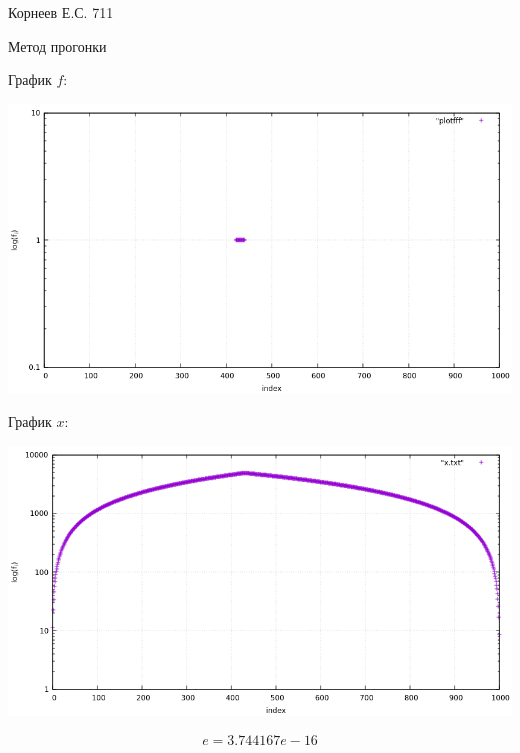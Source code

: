\documentclass[14pt]{article}
\begin{document}
Корнеев Е.С.
711
\begin{center}
	\fontsize{16pt}{18pt}\selectfont
	Метод прогонки
\end{center}

\fontsize{14pt}{16pt}\selectfont

График $f$:

\includegraphics[scale=0.6]{f_plot}

График $x$:

\includegraphics[scale=0.6]{x_plot}

$$
	e = 3.744167e-16
$$
\end{document}
